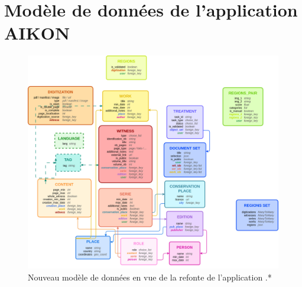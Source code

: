  \section{Modèle de données de l'application AIKON}
	\begin{figure}[H]
		\centering
		\includegraphics[width=16cm]{figues/model_aikon.png}
		\caption{Nouveau modèle de données en vue de la refonte de l'application \aikon.*}
		\label{fig:aikon_model}
	\end{figure}

 